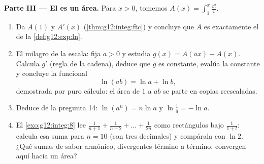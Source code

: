 \begin{problem}
\medskip
\noindent\textbf{Parte III --- El  es un área.}
Para $x > 0$, tomemos $A(x) = \displaystyle\int_1^x \frac{\dd t}{t}$.
\begin{enumerate}[resume]
  \item Da $A(1)$ y $A'(x)$ (\cref{thm:g12:integ:ftc}) y concluye que $A$
        es exactamente el  de la
        \cref{def:g12:exp:ln}.
  \item El milagro de la escala: fija $a > 0$ y estudia
        $g(x) = A(ax) - A(x)$. Calcula $g'$ (regla de la cadena), deduce
        que $g$ es constante, evalúa la constante y concluye la 
        funcional
        \[
        \ln(ab) = \ln a + \ln b ,
        \]
        demostrada por puro cálculo: el área de $1$ a $ab$ se parte en
        copias reescaladas.
  \item Deduce de la pregunta 14: $\ln(a^n) = n\ln a$ y
        $\ln\frac1a = -\ln a$.
  \item El \cref{exo:g12:integ:8} lee
        $\frac{1}{n+1} + \frac{1}{n+2} + \dots + \frac{1}{2n}$ como
        rectángulos bajo $\frac{1}{1 + t}$: calcula esa suma para $n = 10$
        (con tres decimales) y compárala con $\ln 2$. ¿Qué sumas de sabor
        armónico, divergentes término a término, convergen aquí hacia un
        área?
\end{enumerate}


\end{problem}
